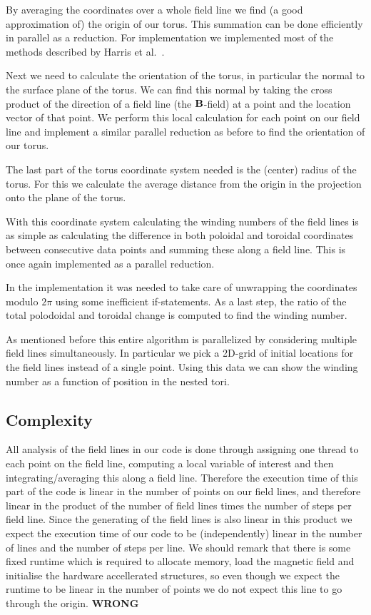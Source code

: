 \documentclass{article}
\renewcommand{\vec}{\bold}
\begin{document}
By averaging the coordinates over a whole field line we find (a good approximation of) the origin of our torus. This summation can be done efficiently in parallel as a reduction. For implementation we implemented most of the methods described by Harris et al.~\cite{harris2007optimizing}.

Next we need to calculate the orientation of the torus, in particular the normal to the surface plane of the torus. We can find this normal by taking the cross product of the direction of a field line (the $\vec{B}$-field) at a point and the location vector of that point. We perform this local calculation for each point on our field line and implement a similar parallel reduction as before to find the orientation of our torus.

The last part of the torus coordinate system needed is the (center) radius of the torus. For this we calculate the average distance from the origin in the projection onto the plane of the torus. %

With this coordinate system calculating the winding numbers of the field lines is as simple as calculating the difference in both poloidal and toroidal coordinates between consecutive data points and summing these along a field line. This is once again implemented as a parallel reduction.

In the implementation it was needed to take care of unwrapping the coordinates modulo $2\pi$ using some inefficient if-statements. %
As a last step, the ratio of the total polodoidal and toroidal change is computed to find the winding number.

As mentioned before this entire algorithm is parallelized by considering multiple field lines simultaneously. In particular we pick a 2D-grid of initial locations for the field lines instead of a single point. Using this data we can show the winding number as a function of position in the nested tori.\\
\subsection{Complexity}
All analysis of the field lines in our code is done through assigning one thread to each point on the field line, computing a local variable of interest and then integrating/averaging this along a field line. Therefore the execution time of this part of the code is linear in the number of points on our field lines, and therefore linear in the product of the number of field lines times the number of steps per field line. Since the generating of the field lines is also linear in this product we expect the execution time of our code to be (independently) linear in the number of lines and the number of steps per line. We should remark that there is some fixed runtime which is required to allocate memory, load the magnetic field and initialise the hardware accellerated structures, so even though we expect the runtime to be linear in the number of points we do not expect this line to go through the origin.
 \textbf{WRONG}
\end{document}
